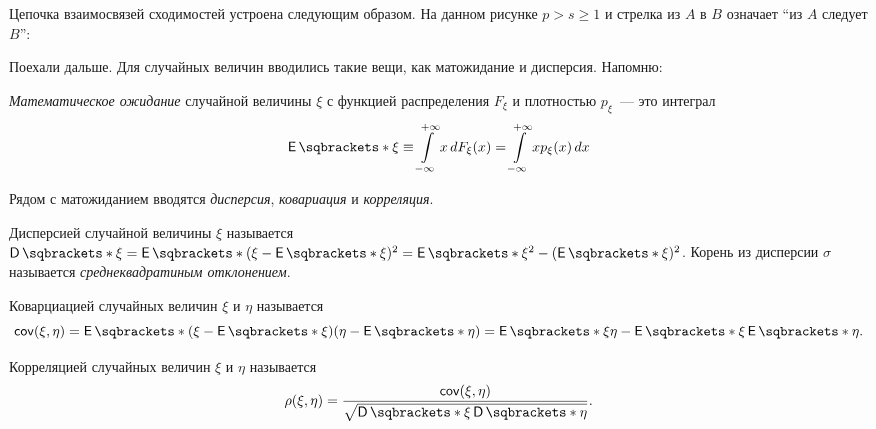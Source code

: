 Цепочка взаимосвязей сходимостей устроена следующим образом. На данном рисунке 
\(p > s \geq 
1\) и стрелка из \(A\) в \(B\) означает ``из \(A\) следует \(B\)'':
\begin{center}
\end{center}

Поехали дальше. Для случайных величин вводились такие вещи, как матожидание и 
дисперсия. Напомню:
\begin{definition}
    \emph{Математическое ожидание} случайной величины \(\xi\) с функцией 
    распределения \(F_{\xi}\) и плотностью \(p_{\xi}\)~--- это интеграл 
    \[
        \E{\xi} \equiv \int\limits_{-\infty}^{+\infty} x\diff F_{\xi}(x) = 
        \int\limits_{-\infty}^{+\infty} xp_{\xi}(x)\diff x
    \]
\end{definition}

Рядом с матожиданием вводятся \emph{дисперсия}, \emph{ковариация} и 
\emph{корреляция}.
\begin{definition}
    Дисперсией случайной величины \(\xi\) называется \(\D{\xi} = \E{(\xi - 
    \E{\xi})^{2}} = \E{\xi^{2}} - (\E{\xi})^{2}\). Корень из дисперсии 
    \(\sigma\) называется \emph{среднеквадратиным отклонением}.
\end{definition}
\begin{definition}
    Коварциацией случайных величин \(\xi\) и \(\eta\) называется 
    \[
        \cov(\xi, \eta) = \E{(\xi - \E{\xi})(\eta - \E{\eta})} = \E{\xi\eta} - 
        \E{\xi}\E{\eta}.
    \]
\end{definition}
\begin{definition}
    Корреляцией случайных величин \(\xi\) и \(\eta\) называется 
    \[
        \rho(\xi, \eta) = \frac{\cov(\xi, \eta)}{\sqrt{\D{\xi}\D{\eta}}}.
    \]
\end{definition}

